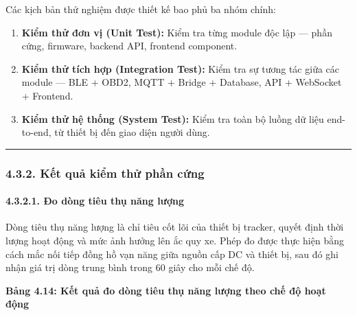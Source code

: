 \documentclass[13pt,a4paper]{extarticle}
\renewcommand{\\}{\thesislongtableorignewline\hline}%
\newcommand{\thesistabletitle}[1]{%
  \begin{center}\textbf{#1}\end{center}%
}
\providecommand{\tightlist}{%
  \setlength{\itemsep}{0pt}\setlength{\parskip}{0pt}}
\begin{document}
Các kịch bản thử nghiệm được thiết kế bao phủ ba nhóm chính:

\begin{enumerate}
\def\labelenumi{\arabic{enumi}.}
\tightlist
\item
  \textbf{Kiểm thử đơn vị (Unit Test):} Kiểm tra từng module độc lập ---
  phần cứng, firmware, backend API, frontend component.
\item
  \textbf{Kiểm thử tích hợp (Integration Test):} Kiểm tra sự tương tác
  giữa các module --- BLE + OBD2, MQTT + Bridge + Database, API +
  WebSocket + Frontend.
\item
  \textbf{Kiểm thử hệ thống (System Test):} Kiểm tra toàn bộ luồng dữ
  liệu end-to-end, từ thiết bị đến giao diện người dùng.
\end{enumerate}

\begin{center}\rule{0.5\linewidth}{0.5pt}\end{center}

\subsubsection{4.3.2. Kết quả kiểm thử phần
cứng}\label{432-kux1ebft-quux1ea3-kiux1ec3m-thux1eed-phux1ea7n-cux1ee9ng}

\paragraph{4.3.2.1. Đo dòng tiêu thụ năng
lượng}\label{4321-ux111o-duxf2ng-tiuxeau-thux1ee5-nux103ng-lux1b0ux1ee3ng}

Dòng tiêu thụ năng lượng là chỉ tiêu cốt lõi của thiết bị tracker, quyết
định thời lượng hoạt động và mức ảnh hưởng lên ắc quy xe. Phép đo được
thực hiện bằng cách mắc nối tiếp đồng hồ vạn năng giữa nguồn cấp DC và
thiết bị, sau đó ghi nhận giá trị dòng trung bình trong 60 giây cho mỗi
chế độ.

\thesistabletitle{Bảng 4.14: Kết quả đo dòng tiêu thụ năng lượng theo chế độ hoạt
động}
\end{document}
